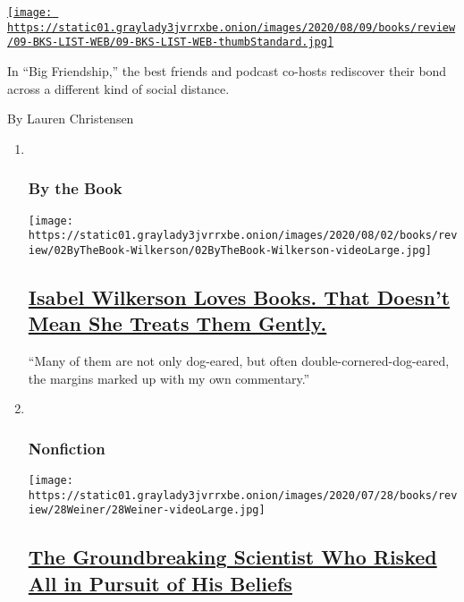 \begin{enumerate}
\begin{enumerate}
    \href{/2020/07/30/books/review/aminatou-sow-ann-friedman-big-friendship.html}{\texttt{[image: https://static01.graylady3jvrrxbe.onion/images/2020/08/09/books/review/09-BKS-LIST-WEB/09-BKS-LIST-WEB-thumbStandard.jpg]}}

    In ``Big Friendship,'' the best friends and podcast co-hosts
    rediscover their bond across a different kind of social distance.

    By Lauren Christensen
  \end{enumerate}
\end{enumerate}

\begin{enumerate}
\def\labelenumi{\arabic{enumi}.}
\item ~
  \hypertarget{by-the-book}{%
  \subsubsection{By the Book}\label{by-the-book}}

  \texttt{[image: https://static01.graylady3jvrrxbe.onion/images/2020/08/02/books/review/02ByTheBook-Wilkerson/02ByTheBook-Wilkerson-videoLarge.jpg]}

  \hypertarget{isabel-wilkerson-loves-books-that-doesnt-mean-she-treats-them-gently}{%
  \subsection{\texorpdfstring{\href{/2020/07/30/books/review/isabel-wilkerson-by-the-book-interview.html}{Isabel
  Wilkerson Loves Books. That Doesn't Mean She Treats Them
  Gently.}}{Isabel Wilkerson Loves Books. That Doesn't Mean She Treats Them Gently.}}\label{isabel-wilkerson-loves-books-that-doesnt-mean-she-treats-them-gently}}

  ``Many of them are not only dog-eared, but often
  double-cornered-dog-eared, the margins marked up with my own
  commentary.''
\item ~
  \hypertarget{nonfiction-2}{%
  \subsubsection{Nonfiction}\label{nonfiction-2}}

  \texttt{[image: https://static01.graylady3jvrrxbe.onion/images/2020/07/28/books/review/28Weiner/28Weiner-videoLarge.jpg]}

  \hypertarget{the-groundbreaking-scientist-who-risked-all-in-pursuit-of-his-beliefs}{%
  \subsection{\texorpdfstring{\href{/2020/07/28/books/review/a-dominant-character-haldane-samanth-subramanian.html}{The
  Groundbreaking Scientist Who Risked All in Pursuit of His
  Beliefs}}{The Groundbreaking Scientist Who Risked All in Pursuit of His Beliefs}}\label{the-groundbreaking-scientist-who-risked-all-in-pursuit-of-his-beliefs}}


\end{enumerate}

